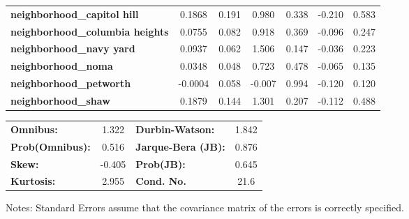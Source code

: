 \begin{center}
\begin{tabular}{lcccccc}
\textbf{neighborhood\_capitol hill}     &       0.1868  &        0.191     &     0.980  &         0.338        &       -0.210    &        0.583     \\
\textbf{neighborhood\_columbia heights} &       0.0755  &        0.082     &     0.918  &         0.369        &       -0.096    &        0.247     \\
\textbf{neighborhood\_navy yard}        &       0.0937  &        0.062     &     1.506  &         0.147        &       -0.036    &        0.223     \\
\textbf{neighborhood\_noma}             &       0.0348  &        0.048     &     0.723  &         0.478        &       -0.065    &        0.135     \\
\textbf{neighborhood\_petworth}         &      -0.0004  &        0.058     &    -0.007  &         0.994        &       -0.120    &        0.120     \\
\textbf{neighborhood\_shaw}             &       0.1879  &        0.144     &     1.301  &         0.207        &       -0.112    &        0.488     \\
\bottomrule
\end{tabular}
\begin{tabular}{lclc}
\textbf{Omnibus:}       &  1.322 & \textbf{  Durbin-Watson:     } &    1.842  \\
\textbf{Prob(Omnibus):} &  0.516 & \textbf{  Jarque-Bera (JB):  } &    0.876  \\
\textbf{Skew:}          & -0.405 & \textbf{  Prob(JB):          } &    0.645  \\
\textbf{Kurtosis:}      &  2.955 & \textbf{  Cond. No.          } &     21.6  \\
\bottomrule
\end{tabular}
\end{center}

Notes: \newline
 [1] Standard Errors assume that the covariance matrix of the errors is correctly specified.